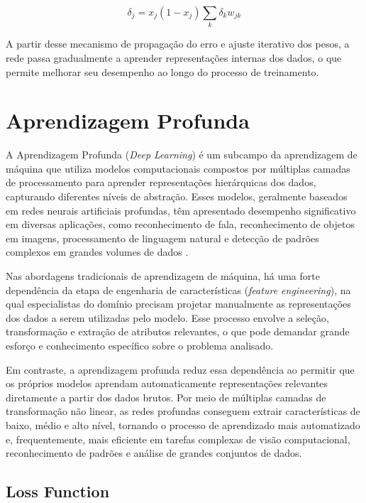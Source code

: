 	\begin{equation}
		\delta_j = x_j(1 - x_j) \sum_{k} \delta_k w_{jk}
		\label{eq:weight-hidden}
	\end{equation}
	
	A partir desse mecanismo de propagação do erro e ajuste iterativo dos pesos, a rede passa gradualmente a aprender representações internas dos dados, o que permite melhorar seu desempenho ao longo do processo de treinamento.
	
	\section{Aprendizagem Profunda}
	A Aprendizagem Profunda (\textit{Deep Learning}) é um subcampo da aprendizagem de máquina que utiliza modelos computacionais compostos por múltiplas camadas de processamento para aprender representações hierárquicas dos dados, capturando diferentes níveis de abstração. Esses modelos, geralmente baseados em redes neurais artificiais profundas, têm apresentado desempenho significativo em diversas aplicações, como reconhecimento de fala, reconhecimento de objetos em imagens, processamento de linguagem natural e detecção de padrões complexos em grandes volumes de dados \cite{lecun2015deep}.
	
	Nas abordagens tradicionais de aprendizagem de máquina, há uma forte dependência da etapa de engenharia de características (\textit{feature engineering}), na qual especialistas do domínio precisam projetar manualmente as representações dos dados a serem utilizadas pelo modelo. Esse processo envolve a seleção, transformação e extração de atributos relevantes, o que pode demandar grande esforço e conhecimento específico sobre o problema analisado.
	
	Em contraste, a aprendizagem profunda reduz essa dependência ao permitir que os próprios modelos aprendam automaticamente representações relevantes diretamente a partir dos dados brutos. Por meio de múltiplas camadas de transformação não linear, as redes profundas conseguem extrair características de baixo, médio e alto nível, tornando o processo de aprendizado mais automatizado e, frequentemente, mais eficiente em tarefas complexas de visão computacional, reconhecimento de padrões e análise de grandes conjuntos de dados.
	
	\subsection{Loss Function}
	
